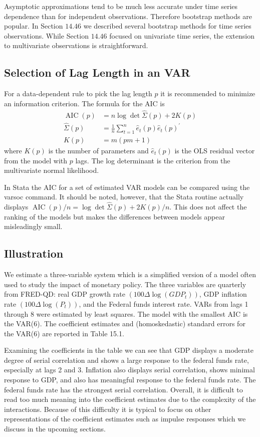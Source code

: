 \documentclass[10pt]{article}
\begin{document}
Asymptotic approximations tend to be much less accurate under time series dependence than for independent observations. Therefore bootstrap methods are popular. In Section $14.46$ we described several bootstrap methods for time series observations. While Section $14.46$ focused on univariate time series, the extension to multivariate observations is straightforward.

\subsection{Selection of Lag Length in an VAR}
For a data-dependent rule to pick the lag length $p$ it is recommended to minimize an information criterion. The formula for the AIC is
$$
\begin{aligned}
\operatorname{AIC}(p) &=n \log \operatorname{det} \widehat{\Sigma}(p)+2 K(p) \\
\widehat{\Sigma}(p) &=\frac{1}{n} \sum_{t=1}^{n} \widehat{e}_{t}(p) \widehat{e}_{t}(p)^{\prime} \\
K(p) &=m(p m+1)
\end{aligned}
$$
where $K(p)$ is the number of parameters and $\widehat{e}_{t}(p)$ is the OLS residual vector from the model with $p$ lags. The log determinant is the criterion from the multivariate normal likelihood.

In Stata the AIC for a set of estimated VAR models can be compared using the varsoc command. It should be noted, however, that the Stata routine actually displays $\operatorname{AIC}(p) / n=\log \operatorname{det} \widehat{\Sigma}(p)+2 K(p) / n$. This does not affect the ranking of the models but makes the differences between models appear misleadingly small.

\subsection{Illustration}
We estimate a three-variable system which is a simplified version of a model often used to study the impact of monetary policy. The three variables are quarterly from FRED-QD: real GDP growth rate $\left(100 \Delta \log \left(G D P_{t}\right)\right)$, GDP inflation rate $\left(100 \Delta \log \left(P_{t}\right)\right)$, and the Federal funds interest rate. VARs from lags 1 through 8 were estimated by least squares. The model with the smallest AIC is the VAR(6). The coefficient estimates and (homoskedastic) standard errors for the VAR(6) are reported in Table 15.1.

Examining the coefficients in the table we can see that GDP displays a moderate degree of serial correlation and shows a large response to the federal funds rate, especially at lags 2 and 3. Inflation also displays serial correlation, shows minimal response to GDP, and also has meaningful response to the federal funds rate. The federal funds rate has the strongest serial correlation. Overall, it is difficult to read too much meaning into the coefficient estimates due to the complexity of the interactions. Because of this difficulty it is typical to focus on other representations of the coefficient estimates such as impulse responses which we discuss in the upcoming sections.
\end{document}
